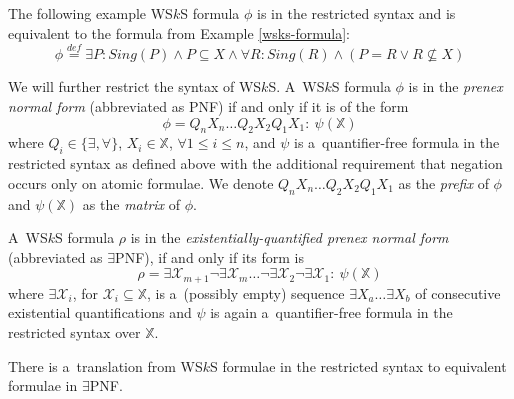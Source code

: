 		\newpage
	  \noindent\hrulefill
  \begin{example}
  The following example WS$k$S formula $\phi$ is in the restricted syntax and is
  equivalent to the formula from Example \ref{wsks-formula}:
  \begin{equation}
   \phi \overset{\mathit{def}}{=} \exists P: \mathit{Sing}(P) \wedge P \subseteq
   X \wedge \forall R: \mathit{Sing}(R) \wedge (P = R \vee R \not\subseteq X)
  \end{equation}
   \hrulefill
  \end{example}\label{wsks-formula-restricted}
	
We will further restrict the syntax of WS$k$S. A~WS$k$S formula $\phi$ is in the
\emph{prenex normal form} (abbreviated as PNF) if and only if it is of the form
\begin{equation}
\phi = Q_nX_n\ldots Q_2X_2Q_1X_1:\ \psi(\mathds{X})
\end{equation} where 
$Q_i \in \{\exists,\forall\}$, $X_i \in \mathds{X}$, $\forall 1 \leq i \leq n$,
and $\psi$ is a~quantifier-free formula in the restricted syntax as defined
above with the additional requirement that negation occurs only on atomic
formulae.
We denote $Q_nX_n\ldots Q_2X_2Q_1X_1$ as the \emph{prefix} of $\phi$ and $\psi(\mathds{X})$ as the \emph{matrix} of $\phi$.
	
A~WS$k$S formula $\rho$ is in the \emph{existentially-quantified prenex normal
form} (abbreviated as $\exists$PNF), if and only if its form is 
\begin{equation}\rho =
\exists \mathcal{X}_{m+1}\neg\exists \mathcal{X}_m\ldots\neg\exists
\mathcal{X}_2\neg\exists \mathcal{X}_1:\ \psi(\mathds{X})
\end{equation} where
$\exists\mathcal{X}_i$, for $\mathcal{X}_i \subseteq \mathds{X}$, is a~(possibly
empty) sequence $\exists X_a\ldots\exists X_b$ of consecutive existential
quantifications and $\psi$ is again a~quantifier-free formula in the restricted
syntax over $\mathds{X}$.

	\begin{prop}
There is a~translation from WS$k$S formulae in the restricted syntax to
equivalent formulae in $\exists$PNF.
	\end{prop}
	
